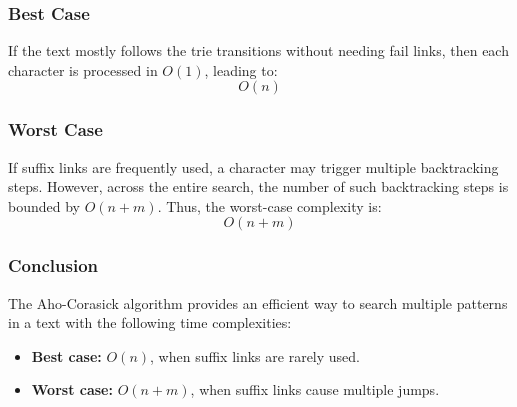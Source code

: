 \subsubsection*{Best Case}
If the text mostly follows the trie transitions without needing fail links, then each character is processed in \( O(1) \), leading to: \[ O(n) \]

\subsubsection*{Worst Case}
If suffix links are frequently used, a character may trigger multiple backtracking steps. However, across the entire search, the number of such backtracking steps is bounded by \( O(n + m) \). Thus, the worst-case complexity is: \[ O(n + m) \]

\subsubsection*{Conclusion}
The Aho-Corasick algorithm provides an efficient way to search multiple patterns in a text with the following time complexities:

\begin{itemize}
    \item \textbf{Best case:} \( O(n) \), when suffix links are rarely used.
    \item \textbf{Worst case:} \( O(n + m) \), when suffix links cause multiple jumps.
\end{itemize}
